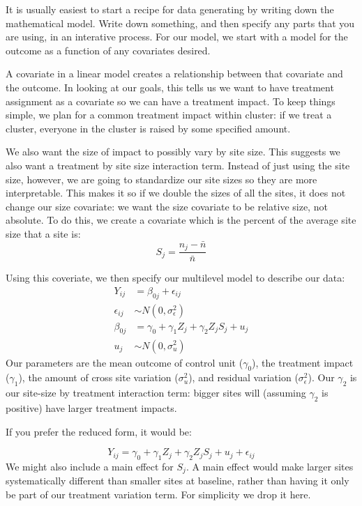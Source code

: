 \documentclass[
]{book}
\begin{document}
It is usually easiest to start a recipe for data generating by writing down the mathematical model.
Write down something, and then specify any parts that you are using, in an interative process.
For our model, we start with a model for the outcome as a function of any covariates desired.

A covariate in a linear model creates a relationship between that covariate and the outcome.
In looking at our goals, this tells us we want to have treatment assignment as a covariate so we can have a treatment impact.
To keep things simple, we plan for a common treatment impact within cluster: if we treat a cluster, everyone in the cluster is raised by some specified amount.

We also want the size of impact to possibly vary by site size.
This suggests we also want a treatment by site size interaction term.
Instead of just using the site size, however, we are going to standardize our site sizes so they are more interpretable.
This makes it so if we double the sizes of all the sites, it does not change our size covariate: we want the size covariate to be relative size, not absolute.
To do this, we create a covariate which is the percent of the average site size that a site is:
\[ S_j = \frac{n_j - \bar{n}}{ \bar{n} } \]

Using this coveriate, we then specify our multilevel model to describe our data:
\[
\begin{aligned}
Y_{ij} &= \beta_{0j} + \epsilon_{ij} \\
\epsilon_{ij} &\sim N( 0, \sigma^2_\epsilon ) \\
\beta_{0j} &= \gamma_{0} + \gamma_{1} Z_j + \gamma_2 Z_j S_j + u_j \\
u_j &\sim N( 0, \sigma^2_u )
\end{aligned}
\]
Our parameters are the mean outcome of control unit (\(\gamma_0\)), the treatment impact (\(\gamma_1\)), the amount of cross site variation (\(\sigma^2_u\)), and residual variation (\(\sigma^2_\epsilon\)).
Our \(\gamma_2\) is our site-size by treatment interaction term: bigger sites will (assuming \(\gamma_2\) is positive) have larger treatment impacts.

If you prefer the reduced form, it would be:

\[ Y_{ij} = \gamma_{0} + \gamma_{1} Z_j + \gamma_2 Z_j S_j  + u_j + \epsilon_{ij}  \]
We might also include a main effect for \(S_j\).
A main effect would make larger sites systematically different than smaller sites at baseline, rather than having it only be part of our treatment variation term.
For simplicity we drop it here.
\end{document}
